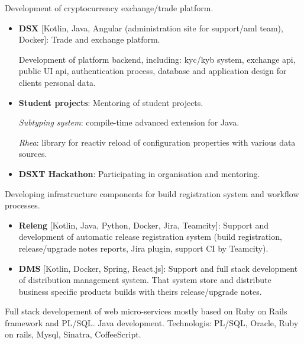 \documentclass{cv}
\begin{document}
\begin{cvblock}{%
		}

	Development of cryptocurrency exchange/trade platform.

	\begin{itemize}
		\item \textbf{DSX} [Kotlin, Java, Angular (administration site for support/aml team), Docker]: Trade and exchange platform.

		      Development of platform backend, including:
		      kyc/kyb system, exchange api, public UI api, authentication process,
		      database and application design for clients personal data.
		\item \textbf{Student projects}: Mentoring of student projects.

		      \emph{Subtyping system}: compile-time advanced extension for Java.

		      \emph{Rhea}: library for reactiv reload of configuration properties with various data sources.

		\item \textbf{DSXT Hackathon}: Participating in organisation and mentoring.
	\end{itemize}
\end{cvblock}

\begin{cvblock}{%
		}

	Developing infrastructure components for build registration
	system and workflow processes.

	\begin{itemize}
		\item \textbf{Releng} [Kotlin, Java, Python, Docker, Jira, Teamcity]: Support and development of automatic release registration system
		      (build registration, release/upgrade notes reports, Jira plugin,
		      support CI by Teamcity).
		\item \textbf{DMS} [Kotlin, Docker, Spring, React.js]: Support and full stack development of distribution management system. That system store and distribute
		      business specific products builds with theirs release/upgrade notes.
	\end{itemize}
\end{cvblock}

\begin{cvblock}{%
		}

	Full stack developement of web micro-services mostly based on Ruby on Rails framework and PL/SQL\@.
	Java development. Technologis: PL/SQL, Oracle, Ruby on rails, Mysql, Sinatra, CoffeeScript.
\end{cvblock}
\end{document}
